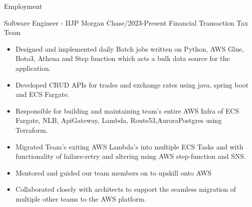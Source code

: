 \documentclass[]{mcdowellcv}
\begin{document}
    \begin{cvsection}{Employment}

        \begin{cvsubsection}{Software Engineer - II}{JP Morgan Chase}{/2023-Present}
            Financial Transaction Tax Team
            \begin{itemize}
                \item Designed and implemented daily Batch jobs written on Python, AWS Glue, Boto3, Athena and Step function which acts a bulk data source for the application.
                \item Developed CRUD APIs for trades and exchange rates using java, spring boot and ECS Fargate.
                \item Responsible for building and maintaining team's entire AWS Infra of ECS Fargate, NLB, ApiGateway, Lambda, Route53,AuroraPostgres using Terraform.
                \item Migrated Team's exiting AWS Lambda's into multiple ECS Tasks and with functionality of failure-retry and altering using AWS step-function and SNS.
                \item Mentored and guided our team members on to upskill onto AWS
                \item Collaborated closely with architects to support the seamless migration of multiple other teams to the AWS platform.
            \end{itemize}
        \end{cvsubsection}


\end{cvsection}
\end{document}
